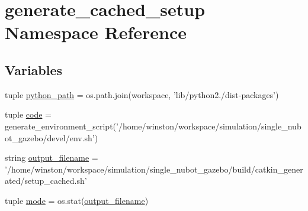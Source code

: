 \hypertarget{namespacegenerate__cached__setup}{\section{generate\-\_\-cached\-\_\-setup Namespace Reference}
\label{namespacegenerate__cached__setup}
}
\subsection*{Variables}
\begin{DoxyCompactItemize}
\item 
tuple \hyperlink{namespacegenerate__cached__setup_a770288702e38f06cf1b86a33bc07723e}{python\-\_\-path} = os.\-path.\-join(workspace, 'lib/python2./dist-\/packages')
\item 
tuple \hyperlink{namespacegenerate__cached__setup_a4ed71aac3acd6cda6640f912559b5408}{code} = generate\-\_\-environment\-\_\-script('/home/winston/workspace/simulation/single\-\_\-nubot\-\_\-gazebo/devel/env.\-sh')
\item 
string \hyperlink{namespacegenerate__cached__setup_a0265aee5075ee1eb701ff69c98ad6793}{output\-\_\-filename} = '/home/winston/workspace/simulation/single\-\_\-nubot\-\_\-gazebo/build/catkin\-\_\-generated/setup\-\_\-cached.\-sh'
\item 
tuple \hyperlink{namespacegenerate__cached__setup_afd1a431f16a2a78ef0438a658e4ac3cf}{mode} = os.\-stat(\hyperlink{namespacegenerate__cached__setup_a0265aee5075ee1eb701ff69c98ad6793}{output\-\_\-filename})
\end{DoxyCompactItemize}


